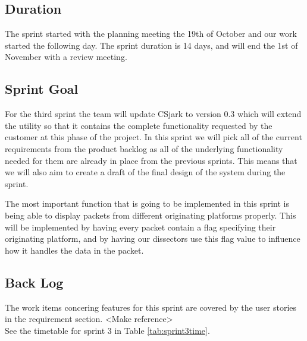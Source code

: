 \subsection{Duration}

The sprint started with the planning meeting the 19th of October and our work started the following day. The sprint duration is 14 days, and will end the 1st of November with a review meeting. 


\subsection{Sprint Goal}
For the third sprint the team will update CSjark to version 0.3 which will extend the utility so that it contains the complete functionality requested by the customer at this phase of the project. In this sprint we will pick all of the current requirements from the product backlog as all of the underlying functionality needed for them are already in place from the previous sprints. This means that we will also aim to create a draft of the final design of the system during the sprint.

The most important function that is going to be implemented in this sprint is being able to display packets from different originating platforms properly. This will be implemented by having every packet contain a flag specifying their originating platform, and by having our dissectors use this flag value to influence how it handles the data in the packet.

\subsection{Back Log}
The work items concering features for this sprint are covered by the user stories in the requirement section. <Make reference>
\\
See the timetable for sprint 3 in Table \ref{tab:sprint3time}.


